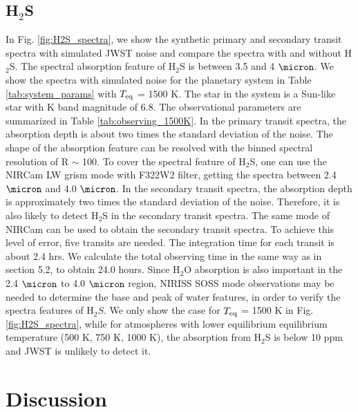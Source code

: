 \documentclass[twocolumn]{aastex61}
\begin{document}
\subsection{H$_2$S}
In Fig. \ref{fig:H2S_spectra}, we show the synthetic primary and secondary transit spectra with simulated JWST noise and compare the spectra with and without H$_2$S. The spectral absorption feature of H$_2$S is between 3.5 and 4 $\micron$. We show the spectra with simulated noise for the planetary system in Table \ref{tab:system_params} with $T_{\rm eq}$ = 1500 K. The star in the system is a Sun-like star with K band magnitude of 6.8. The observational parameters are summarized in Table \ref{tab:observing_1500K}. In the primary transit spectra, the absorption depth is about two times the standard deviation of the noise. The shape of the absorption feature can be resolved with the binned spectral resolution of R $\sim$ 100. To cover the spectral feature of H$_2$S, one can use the NIRCam LW grism mode with F322W2 filter, getting the spectra between 2.4 $\micron$ and 4.0 $\micron$. In the secondary transit spectra, the absorption depth is approximately two times the standard deviation of the noise. Therefore, it is also likely to detect H$_2$S in the secondary transit spectra. The same mode of NIRCam can be used to obtain the secondary transit spectra. To achieve this level of error, five transits are needed. The integration time for each transit is about 2.4 hrs. We calculate the total observing time in the same way as in section 5.2, to obtain 24.0 hours.  Since H$_2$O absorption is also important in the 2.4 $\micron$ to 4.0 $\micron$ region, NIRISS SOSS mode observations may be needed to determine the base and peak of water features, in order to verify the spectra features of H$_2S$. We only show the case for $T_{\rm eq}$ = 1500 K in Fig. \ref{fig:H2S_spectra}, while for atmospheres with lower equilibrium equilibrium temperature (500 K, 750 K, 1000 K), the absorption from H$_2$S is below 10 ppm and JWST is unlikely to detect it.   

\section{Discussion}\label{sec:discussions}
\end{document}
